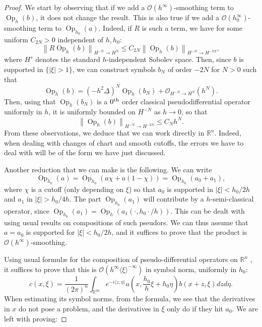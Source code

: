 \documentclass[AHL,Unicode,longabstracts,published]{cedram}
\newcommand{\R}{\mathbb{R}}
\newcommand{\mc}{\mathcal}
\newcommand{\clO}{\mathcal{O}}
\DeclareMathOperator{\Op}{Op}
\begin{document}
\begin{proof}
We start by observing that if we add a $\clO(h^\infty)$-smoothing term to $\Op_h(b)$, it does not change the result. This is also true if we add a $\clO(h_0^\infty)$-smoothing term to $\Op_{h_0}(a)$. Indeed, if $R$ is such a term, we have for some uniform $C_{2N} > 0$ independent of $h,h_0$:
\[
\left\| R \Op_h(b)\right\|_{H^{-N}\to H^N} \leq C_{2N} \left\| \Op_h(b)\right\|_{H^{-N}\to H^{-3N}},
\]
where $H^s$ denotes the standard $h$-independent Sobolev space. Then, since $b$ is supported in $\{ |\xi|> 1 \}$, we can construct symbols $b_N$ of order $-2N$ for $N>0$ such that
\[
\Op_h(b) = \left(-h^2\Delta\right)^N\Op_h(b_N) + \clO_{H^{-N}\to H^N}\left(h^N\right).
\]
Then, using that $\Op_h(b_N)$ is a $0^{\rm th}$ order classical pseudodifferential operator uniformly in $h$, it is uniformly bounded on $H^{-N}$ as $h\to 0$, so that
\[
\left\| \Op_h(b)\right\|_{H^{-N}\to H^{-3N}} \leq C_N h^N.
\]
From these observations, we deduce that we can work directly in $\R^n$. Indeed, when dealing with changes of chart and smooth cutoffs, the errors we have to deal with will be of the form we have just discussed.

Another reduction that we can make is the following. We can write
\[
\Op_{h_0}(a) = \Op_{h_0}(a \chi + a(1-\chi)) = \Op_{h_0}(a_0+a_1),
\]
where $\chi$ is a cutoff (only depending on $\xi$) so that $a_0$ is supported in $|\xi| < h_0/2h$ and $a_1$ in $|\xi| > h_0/4h$. The part $\Op_{h_0}(a_1)$ will contribute by a $h$-semi-classical operator, since $\Op_{h_0}(a_1) = \Op_h (a_1(\cdot, h_0\cdot /h))$. This can be dealt with using usual results on compositions of such pseudors. We can thus assume that $a=a_0$ is supported for $|\xi|< h_0 /2h$, and it suffices to prove that the product is $\mc{O}(h^\infty)$-smoothing.

Using usual formulæ for the composition of pseudo-differential operators on $\R^n$ \cite[Theorem~4.14]{Zworski-12}, it suffices to prove that this is $\clO(h^\infty \langle\xi\rangle^{-\infty})$ in symbol norm, uniformly in $h_0$:
\[
c (x, \xi) = \frac{1}{(2\pi)^n}\int_{\R^{2n}} e^{-i \langle z, \eta \rangle } a\left(x, \frac{h_0}{h}\xi + h_0\eta\right) b(x+z, \xi) dz d\eta.
\]
When estimating its symbol norms, from the formula, we see that the derivatives in $x$ do not pose a problem, and the derivatives in $\xi$ only do if they hit $a_0$. We are left with proving:


\end{proof}
\end{document}
